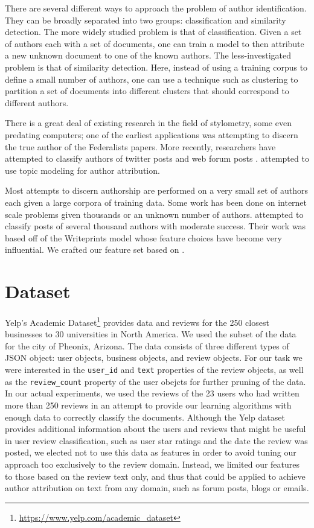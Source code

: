 \documentclass[12pt]{article}
\begin{document}
There are several different ways to approach the problem of author identification. They can be broadly separated into two groups: classification and similarity detection. The more widely studied problem is that of classification. Given a set of authors each with a set of documents, one can train a model to then attribute a new unknown document to one of the known authors. The less-investigated problem is that of similarity detection. Here, instead of using a training corpus to define a small number of authors, one can use a technique such as clustering to partition a set of documents into different clusters that should correspond to different authors.

There is a great deal of existing research in the field of stylometry, some even predating computers; one of the earliest applications was attempting to discern the true author of the Federalists papers. More recently, researchers have attempted to classify authors of twitter posts \cite{Castro2012,Layton2010} and web forum posts \cite{Pillay2010,Tan2010}. \cite{Savoy2013} attempted to use topic modeling for author attribution.

Most attempts to discern authorship are performed on a very small set of authors each given a large corpora of training data. Some work has been done on internet scale problems given thousands or an unknown number of authors. \cite{Narayanan2012} attempted to classify posts of several thousand authors with moderate success. Their work was based off of the Writeprints model \cite{Abbasi2008} whose feature choices have become very influential. We crafted our feature set based on \cite{Narayanan2012}.

\section{Dataset}
Yelp's Academic Dataset\footnote{\protect\url{https://www.yelp.com/academic_dataset}} provides data and reviews for the 250 closest businesses to 30 universities in North America. We used the subset of the data for the city of Pheonix, Arizona. The data consists of three different types of JSON object: user objects, business objects, and review objects. For our task we were interested in the \texttt{user\_id} and \texttt{text} properties of the review objects, as well as the \texttt{review\_count} property of the user obejcts for further pruning of the data. In our actual experiments, we used the reviews of the 23 users who had written more than 250 reviews in an attempt to provide our learning algorithms with enough data to correctly classify the documents. Although the Yelp dataset provides additional information about the users and reviews that might be useful in user review classification, such as user star ratings and the date the review was posted, we elected not to use this data as features in order to avoid tuning our approach too exclusively to the review domain. Instead, we limited our features to those based on the review text only, and thus that could be applied to achieve author attribution on text from any domain, such as forum posts, blogs or emails.
\end{document}
